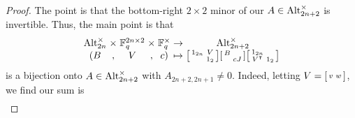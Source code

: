 \begin{proof}
    The point is that the bottom-right $2\times2$ minor of our $A\in\operatorname{Alt}_{2n+2}^\times$ is invertible. Thus, the main point is that
    \[\arraycolsep=1.4pt\begin{array}{ccccccccccc}
        \Alt_{2n}^\times &\times& \FF_q^{2n\times2} &\times& \FF_q^\times &\to& \Alt_{2n+2}^\times \\
        (B &,& V &,& c) &\mapsto& \begin{bsmallmatrix}
            1_{2n} & V \\ & 1_2
        \end{bsmallmatrix}\begin{bsmallmatrix}
            B \\ & cJ
        \end{bsmallmatrix}\begin{bsmallmatrix}
            1_{2n} \\ V^\intercal & 1_2
        \end{bsmallmatrix}
    \end{array}\]
    is a bijection onto $A\in\operatorname{Alt}_{2n+2}^\times$ with $A_{2n+2,2n+1}\ne0$. Indeed, letting $V=\begin{bsmallmatrix}
        v & w
    \end{bsmallmatrix}$, we find our sum is
    \begin{align*}

\end{align*}
\end{proof}
